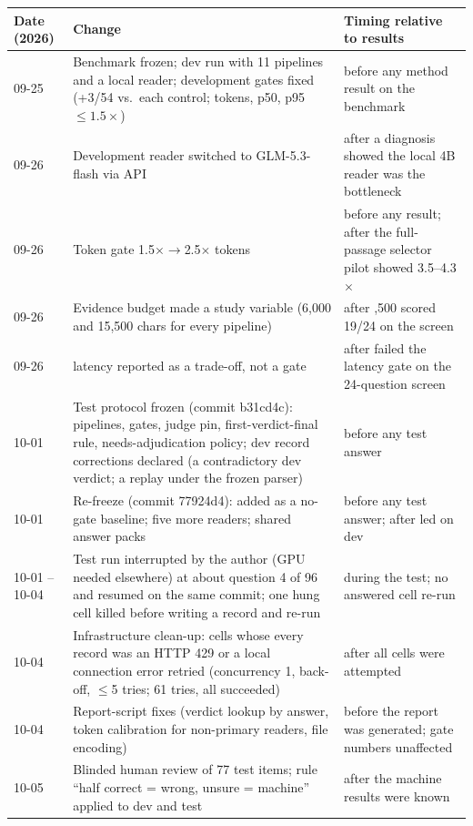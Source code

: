 \begin{table}[t]
\centering
\scriptsize
\begin{tabularx}{\textwidth}{@{}p{1.6cm}Xp{5.4cm}@{}}
\toprule
Date (2026) & Change & Timing relative to results \\
\midrule
09-25 & Benchmark frozen; dev run with 11 pipelines and a local reader; development gates fixed (+3/54 vs.\ each control; tokens, p50, p95 $\le1.5\times$) & before any method result on the benchmark \\
09-26 & Development reader switched to GLM-5.3-flash via API & after a diagnosis showed the local 4B reader was the bottleneck \\
09-26 & Token gate 1.5$\times\to$2.5$\times$ \hybrid{} tokens & before any \lexb{} result; after the full-passage selector pilot showed 3.5--4.3$\times$ \\
09-26 & Evidence budget made a study variable (6,000 and 15,500 chars for every pipeline) & after \hybrid@15,500 scored 19/24 on the screen \\
09-26 & \lexb{} latency reported as a trade-off, not a gate & after \lexb{} failed the latency gate on the 24-question screen \\
10-01 & Test protocol frozen (commit b31cd4c): pipelines, gates, judge pin, first-verdict-final rule, needs-adjudication policy; dev record corrections declared (a contradictory dev verdict; a replay under the frozen parser) & before any test answer \\
10-01 & Re-freeze (commit 77924d4): \setr{} added as a no-gate baseline; five more readers; shared answer packs & before any test answer; after \setr{} led on dev \\
10-01 -- 10-04 & Test run interrupted by the author (GPU needed elsewhere) at about question 4 of 96 and resumed on the same commit; one hung cell killed before writing a record and re-run & during the test; no answered cell re-run \\
10-04 & Infrastructure clean-up: cells whose every record was an HTTP 429 or a local connection error retried (concurrency 1, back-off, $\le$5 tries; 61 tries, all succeeded) & after all cells were attempted \\
10-04 & Report-script fixes (verdict lookup by answer, token calibration for non-primary readers, file encoding) & before the report was generated; gate numbers unaffected \\
10-05 & Blinded human review of 77 test items; rule ``half correct = wrong, unsure = machine'' applied to dev and test & after the machine results were known \\

\end{tabularx}
\end{table}
